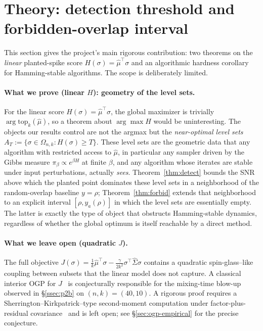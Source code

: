 
\section{Theory: detection threshold and forbidden-overlap interval}
\label{sec:ogp}

This section gives the project's main rigorous contribution: two theorems on the
\emph{linear} planted-spike score $H(\sigma)=\hat\mu^\top\sigma$ and an algorithmic
hardness corollary for Hamming-stable algorithms. The scope is deliberately limited.

\paragraph{What we prove (linear $H$): geometry of the level sets.}
For the linear score $H(\sigma) = \hat\mu^\top \sigma$, the global
maximizer is trivially $\arg\mathrm{top}_k(\hat\mu)$, so a theorem
about $\arg\max H$ would be uninteresting. The objects our results
control are not the argmax but the \emph{near-optimal level sets}
$A_T := \{\sigma \in \Omega_{n,k} : H(\sigma) \ge T\}$. These level
sets are the geometric data that any algorithm with restricted access
to $\hat\mu$, in particular any sampler driven by the Gibbs measure
$\pi_\beta \propto e^{\beta H}$ at finite $\beta$, and any algorithm
whose iterates are stable under input perturbations, actually
\emph{sees}. Theorem~\ref{thm:detect} bounds the SNR above which
the planted point dominates these level sets in a neighborhood of the
random-overlap baseline $y = \rho$; Theorem~\ref{thm:forbid}
extends that neighborhood to an explicit interval $[\rho, y_a(\rho)]$
in which the level sets are essentially empty. The latter is exactly
the type of object that obstructs Hamming-stable dynamics, regardless
of whether the global optimum is itself reachable by a direct method.

\paragraph{What we leave open (quadratic $J$).}
The full objective $J(\sigma) = \tfrac{1}{k}\hat\mu^\top\sigma -
\tfrac{\gamma}{2k^2}\sigma^\top\hat\Sigma\sigma$ contains a quadratic
spin-glass--like coupling between subsets that the linear model does
not capture. A classical interior OGP for $J$~\cite{gamarnik-zadik-clique,gamarnik-pnas}
is conjecturally responsible for the mixing-time blow-up observed in
\S\ref{ssec:p2b} on $(n,k) = (40,10)$. A rigorous proof
requires a Sherrington--Kirkpatrick--type second-moment computation
under factor-plus-residual covariance~\cite{sherrington-kirkpatrick}
and is left open; see \S\ref{sec:ogp-empirical} for the precise
conjecture.

